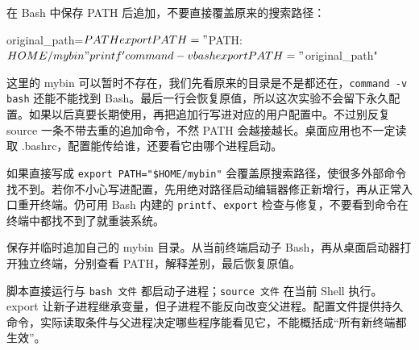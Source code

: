 \begin{example}[临时追加命令搜索路径]
在 Bash 中保存 PATH 后追加，不要直接覆盖原来的搜索路径：


\begin{tbash}
original_path=$PATH
export PATH="$PATH:$HOME/mybin"
printf '%
command -v bash
export PATH="$original_path"
\end{tbash}


这里的 mybin 可以暂时不存在，我们先看原来的目录是不是都还在，\texttt{command -v bash} 还能不能找到 Bash。最后一行会恢复原值，所以这次实验不会留下永久配置。如果以后真要长期使用，再把追加行写进对应的用户配置中。不过别反复 source 一条不带去重的追加命令，不然 PATH 会越接越长。桌面应用也不一定读取 .bashrc，配置能传给谁，还要看它由哪个进程启动。
\end{example}
\begin{note}
如果直接写成 \texttt{export PATH="\$HOME/mybin"} 会覆盖原搜索路径，使很多外部命令找不到。若你不小心写进配置，先用绝对路径启动编辑器修正新增行，再从正常入口重开终端。仍可用 Bash 内建的 \texttt{printf}、\texttt{export} 检查与修复，不要看到命令在终端中都找不到了就重装系统。
\end{note}
\begin{exercise}\label{ex:v1-shell-path}
保存并临时追加自己的 mybin 目录。从当前终端启动子 Bash，再从桌面启动器打开独立终端，分别查看 PATH，解释差别，最后恢复原值。
\end{exercise}
\begin{conclusion}
脚本直接运行与 \texttt{bash 文件} 都启动子进程；\texttt{source 文件} 在当前 Shell 执行。export 让新子进程继承变量，但子进程不能反向改变父进程。配置文件提供持久命令，实际读取条件与父进程决定哪些程序能看见它，不能概括成“所有新终端都生效”。
\end{conclusion}
